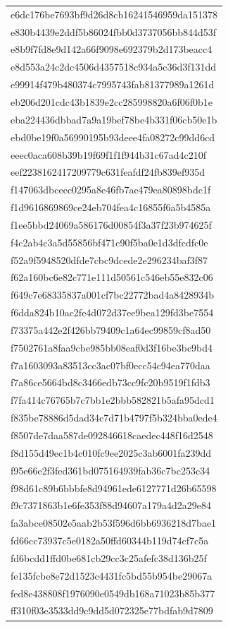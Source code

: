 \begin{tabular}{l}
e6dc176be7693bf9d26d8cb16241546959da151378 \\
e830b4439e2ddf5b86024fbb0d3737056bb844d53f \\
e8b9f7fd8e9d142a66f9098e692379b2d173beacc4 \\
e8d553a24c2dc4506d4357518c934a5c36d3f131dd \\
e99914f479b480374c7995743fab81377989a1261d \\
eb206d201cdc43b1839e2cc285998820a6f06f0b1e \\
eba224436dbbad7a9a19bef78be4b331f06cb50e1b \\
ebd0be19f0a56990195b93deee4fa08272c99dd6cd \\
eeec0aca608b39b19f69f1f1f944b31c67ad4c210f \\
eef2238162417209779c631feafdf24fb839ef935d \\
f147063dbceec0295a8e46fb7ae479ea80898bdc1f \\
f1d9616869869ce24eb704fea4c16855f6a5b4585a \\
f1ee5bbd24069a586176d00854f3a37f23b974625f \\
f4c2ab4c3a5d55856bf471c90f5ba0e1d3dfcdfc0e \\
f52a9f5948520dfde7cbc9dcede2e296234baf3f87 \\
f62a160bc6e82c771e111d50561c546eb55e832c06 \\
f649c7e68335837a001cf7bc22772bad4a8428934b \\
f6dda824b10ac2fe4d072d37ee9bea129fd3be7554 \\
f73375a442e2f426bb79409c1a64ec99859cf8ad50 \\
f7502761a8faa9cbe985bb08eaf0d3f16be3bc9bd4 \\
f7a1603093a83513cc3ac07bf0ecc54c94ea770daa \\
f7a86ce5664bd8c3466edb73cc9fc20b9519f1fdb3 \\
f7fa414c76765b7c7bb1e2bbb582821b5afa95dcd1 \\
f835be78886d5dad34c7d71b4797f5b324bba0ede4 \\
f8507de7daa587de092846618caedec448f16d2548 \\
f8d155d49ec1b4c010fc9ee2025c3ab6001fa239dd \\
f95e66e2f3fed361bd075164939fab36c7bc253c34 \\
f98d61c89b6bbbfe8d94961ede6127771d26b65598 \\
f9c7371863b1e6fe353f88d94607a179a4d2a29e84 \\
fa3abce08502e5aab2b53f596d6bb6936218d7bae1 \\
fd66cc73937c5e0182a50ffd60344b119d74cf7c5a \\
fd6bcdd1ffd0be681cb29cc3c25afefc38d136b25f \\
fe135fcbe8e72d1523c4431fc5bd55b954be29067a \\
fed8e438808f1976090e0549db168a71023b85b377 \\
ff310f03e3533dd9c9dd5d072325e77bdfab9d7809 \\
\bottomrule
\end{tabular}
